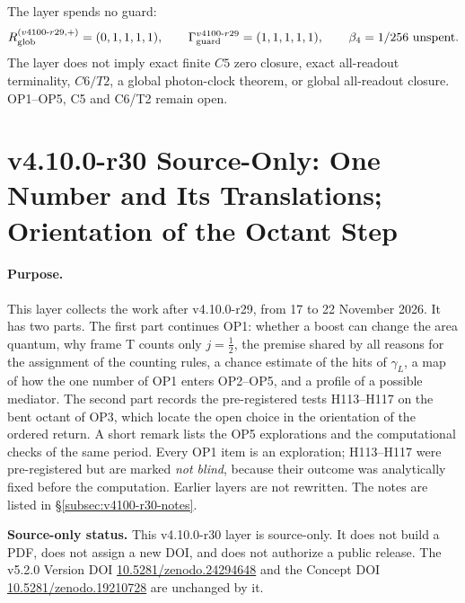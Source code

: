 The layer spends no guard:
\[
R_{\rm glob}^{(v4100\text{-}r29,+)}=(0,1,1,1,1),
\qquad
\Gamma_{\rm guard}^{v4100\text{-}r29}=(1,1,1,1,1),
\qquad
\beta_4=1/256\ \text{unspent}.
\]
The layer does not imply exact finite \(C5\) zero closure, exact all-readout terminality, \(C6/T2\), a global photon-clock theorem,
or global all-readout closure.  OP1--OP5, C5 and C6/T2 remain open.

\clearpage
\section*{v4.10.0-r30 Source-Only: One Number and Its Translations; Orientation of the Octant Step}
\label{sec:v4100-r30-translations}

\paragraph{Purpose.}
This layer collects the work after v4.10.0-r29, from 17 to 22 November 2026.  It has two parts.  The first part continues OP1: whether a boost can
change the area quantum, why frame T counts only \(j=\tfrac12\), the premise shared by all reasons for the assignment of the counting rules, a chance
estimate of the hits of \(\gamma_L\), a map of how the one number of OP1 enters OP2--OP5, and a profile of a possible mediator.  The second part
records the pre-registered tests H113--H117 on the bent octant of OP3, which locate the open choice in the orientation of the ordered return.  A short
remark lists the OP5 explorations and the computational checks of the same period.  Every OP1 item is an exploration; H113--H117 were pre-registered
but are marked \emph{not blind}, because their outcome was analytically fixed before the computation.  Earlier layers are not rewritten.  The notes
are listed in \S\ref{subsec:v4100-r30-notes}.

\noindent\textbf{Source-only status.}
This v4.10.0-r30 layer is source-only.  It does not build a PDF, does not assign a new DOI,
and does not authorize a public release.  The v5.2.0 Version DOI
\href{https://doi.org/10.5281/zenodo.24294648}{10.5281/zenodo.24294648} and the Concept DOI
\href{https://doi.org/10.5281/zenodo.19210728}{10.5281/zenodo.19210728} are unchanged by it.

